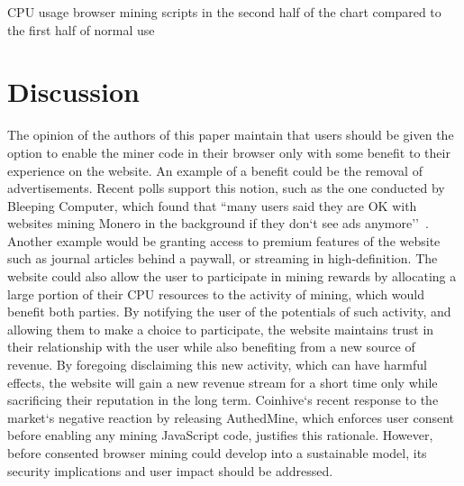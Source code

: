 \begin{center}
	\caption{CPU usage browser mining scripts in the second half of the chart compared to the first half of normal use}
\end{center}

\section{Discussion}

The opinion of the authors of this paper maintain that users should be given the option to enable the miner code in their browser only with some benefit to their experience on the website.  An example of a benefit could be the removal of advertisements. Recent polls support this notion, such as the one conducted by Bleeping Computer, which found that ``many users said they are OK with websites mining Monero in the background if they don`t see ads anymore''~\cite{bleepingcomputerminers}. Another example would be granting access to premium features of the website such as journal articles behind a paywall, or streaming in high-definition. The website could also allow the user to participate in mining rewards by allocating a large portion of their CPU resources to the activity of mining, which would benefit both parties. By notifying the user of the potentials of such activity, and allowing them to make a choice to participate, the website maintains trust in their relationship with the user while also benefiting from a new source of revenue. By foregoing disclaiming this new activity, which can have harmful effects, the website will gain a new revenue stream for a short time only while sacrificing their reputation in the long term. Coinhive`s recent response to the market`s negative reaction by releasing AuthedMine, which enforces user consent before enabling any mining JavaScript code, justifies this rationale. However, before consented browser mining could develop into a sustainable model, its security implications and user impact should be addressed.


